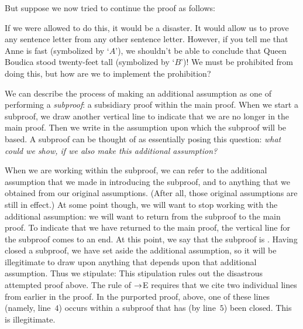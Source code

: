 But suppose we now tried to continue the proof as follows:
\begin{fitchproof}
	\open
		 
	\close
	 
	 
\end{fitchproof}
If we were allowed to do this, it would be a disaster. It would allow us to prove any sentence letter from any other sentence letter. However, if you tell me that Anne is fast (symbolized by `$A$'), we shouldn't be able to conclude that Queen Boudica stood twenty-feet tall (symbolized by `$B$')! We must be prohibited from doing this, but how are we to implement the prohibition?

We can describe the process of making an additional assumption as one of performing a \emph{subproof}: a subsidiary proof within the main proof. When we start a subproof, we draw another vertical line to indicate that we are no longer in the main proof. Then we write in the assumption upon which the subproof will be based. A subproof can be thought of as essentially posing this question: \emph{what could we show, if we also make this additional assumption?}

When we are working within the subproof, we can refer to the additional assumption that we made in introducing the subproof, and to anything that we obtained from our original assumptions. (After all, those original assumptions are still in effect.) At some point though, we will want to stop working with the additional assumption: we will want to return from the subproof to the main proof. To indicate that we have returned to the main proof, the vertical line for the subproof comes to an end. At this point, we say that the subproof is . Having closed a subproof, we have set aside the additional assumption, so it will be illegitimate to draw upon anything that depends upon that additional assumption. Thus we stipulate:
This stipulation rules out the disastrous attempted proof above. The rule of $\rightarrow$E requires that we cite two individual lines from earlier in the proof. In the purported proof, above, one of these lines (namely, line~$4$) occurs within a subproof that has (by line~$5$) been closed. This is illegitimate. 

